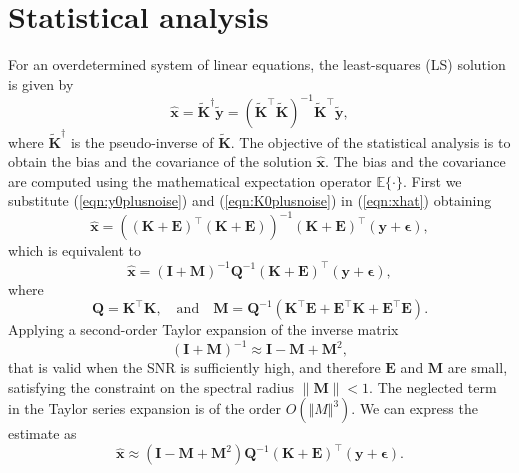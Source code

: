 \section{Statistical analysis}


For an overdetermined system of linear equations, the least-squares (LS) solution is given by
\begin{equation} \widehat{\mathbf{x}} = \widetilde{\mathbf{K}}^\dagger \widetilde{\mathbf{y}} = ( \widetilde{\mathbf{K}}^\top \widetilde{\mathbf{K}} )^{-1} \widetilde{\mathbf{K}}^\top \widetilde{\mathbf{y}} , \label{eqn:xhat} \end{equation}
where $\widetilde{\mathbf{K}}^\dagger$ is the pseudo-inverse of $\widetilde{\mathbf{K}}$.
The objective of the statistical analysis is to obtain the bias and the covariance of the solution $\widehat{\mathbf{x}}$.
The bias and the covariance are computed using the mathematical expectation operator $\mathbb{E}\{\cdot\}$.
First we substitute (\ref{eqn:y0plusnoise}) and (\ref{eqn:K0plusnoise}) in (\ref{eqn:xhat}) obtaining
\begin{equation*} \widehat{\mathbf{x}} = \left( (\mathbf{K}+\mathbf{E})^\top (\mathbf{K}+\mathbf{E})  \right)^{-1} (\mathbf{K}+\mathbf{E})^\top (\mathbf{y}+\bm{\epsilon}), \end{equation*} 
which is equivalent to
\begin{equation} \widehat{\mathbf{x}} = \left( \mathbf{I} + \mathbf{M} \right)^{-1} \mathbf{Q}^{-1} (\mathbf{K}+\mathbf{E})^\top (\mathbf{y}+\bm{\epsilon}), \label{eqn:1steq} \end{equation} 
where 
\begin{equation} \mathbf{Q} = \mathbf{K}^\top \mathbf{K}, \quad \text{and} \quad \mathbf{M} = \mathbf{Q}^{-1} ( \mathbf{K}^\top \mathbf{E} + \mathbf{E}^\top \mathbf{K} + \mathbf{E}^\top \mathbf{E} ). \end{equation} 
Applying a second-order Taylor expansion of the inverse matrix
\begin{equation} (\mathbf{I} + \mathbf{M})^{-1} \approx \mathbf{I} - \mathbf{M} + \mathbf{M}^2, \label{eqn:TseriesExp} \end{equation} 
that is valid when the SNR is sufficiently high, and therefore $\mathbf{E}$ and $\mathbf{M}$ are small, satisfying the constraint on the spectral radius $\| \mathbf{M} \| < 1$. 
The neglected term in the Taylor series expansion is of the order $O(\Vert M \Vert^3)$.
We can express the estimate as
\begin{equation} \widehat{\mathbf{x}} \approx \left( \mathbf{I} - \mathbf{M} + \mathbf{M}^2 \right) \mathbf{Q}^{-1} (\mathbf{K}+\mathbf{E})^\top (\mathbf{y}+\bm{\epsilon}). \label{eqn:xhatexp} \end{equation} 

